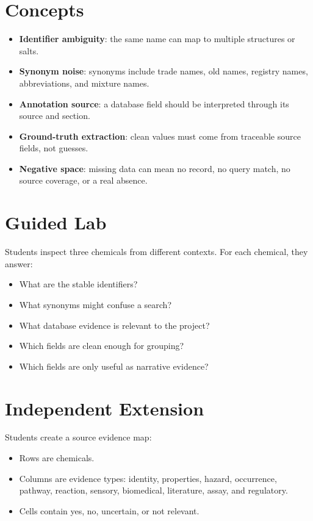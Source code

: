 \section{Concepts}
\begin{itemize}
  \item \textbf{Identifier ambiguity}: the same name can map to multiple structures or salts.
  \item \textbf{Synonym noise}: synonyms include trade names, old names, registry names, abbreviations, and mixture names.
  \item \textbf{Annotation source}: a database field should be interpreted through its source and section.
  \item \textbf{Ground-truth extraction}: clean values must come from traceable source fields, not guesses.
  \item \textbf{Negative space}: missing data can mean no record, no query match, no source coverage, or a real absence.
\end{itemize}

\section{Guided Lab}
Students inspect three chemicals from different contexts. For each chemical, they answer:
\begin{itemize}
  \item What are the stable identifiers?
  \item What synonyms might confuse a search?
  \item What database evidence is relevant to the project?
  \item Which fields are clean enough for grouping?
  \item Which fields are only useful as narrative evidence?
\end{itemize}


\section{Independent Extension}
Students create a source evidence map:
\begin{itemize}
  \item Rows are chemicals.
  \item Columns are evidence types: identity, properties, hazard, occurrence, pathway, reaction, sensory, biomedical, literature, assay, and regulatory.
  \item Cells contain yes, no, uncertain, or not relevant.
\end{itemize}

